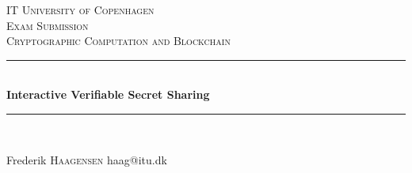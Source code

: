 \begin{titlepage}

\newcommand{\HRule}{\rule{\linewidth}{0.5mm}} %

\center %


\textsc{\LARGE IT University of Copenhagen}\\[1.5cm] %
\textsc{\Large Exam Submission}\\[0.5cm] %
\textsc{\large Cryptographic Computation and Blockchain}\\[0.5cm] %


\HRule \\[0.4cm]
{ \huge \bfseries Interactive Verifiable Secret Sharing}\\[0.4cm] %
\HRule \\[1.5cm]


\begin{minipage}{0.4\textwidth}
\begin{flushleft} \large
Frederik \textsc{Haagensen} haag@itu.dk
\end{flushleft}
\end{minipage}




\end{titlepage}
